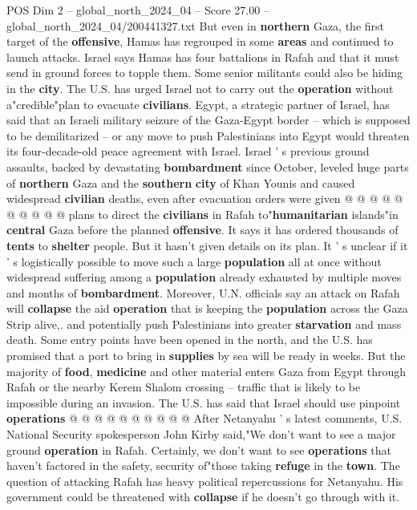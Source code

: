\begin{textsample}{POS Dim 2 – global\_north\_2024\_04 – Score 27.00 – global\_north\_2024\_04/200441327.txt}
But even in \textbf{northern} Gaza, the first target of the \textbf{offensive}, Hamas has regrouped in some \textbf{areas} and continued to launch attacks.
Israel says Hamas has four battalions in Rafah and that it must send in ground forces to topple them.
Some senior militants could also be hiding in the \textbf{city}.
The U.S. has urged Israel not to carry out the \textbf{operation} without a"credible"plan to evacuate \textbf{civilians}.
Egypt, a strategic partner of Israel, has said that an Israeli military seizure of the Gaza-Egypt border -- which is supposed to be demilitarized -- or any move to push Palestinians into Egypt would threaten its four-decade-old peace agreement with Israel.
Israel ' s previous ground assaults, backed by devastating \textbf{bombardment} since October, leveled huge parts of \textbf{northern} Gaza and the \textbf{southern} \textbf{city} of Khan Younis and caused widespread \textbf{civilian} deaths, even after evacuation orders were given @ @ @ @ @ @ @ @ @ @ plans to direct the \textbf{civilians} in Rafah to"\textbf{humanitarian} islands"in \textbf{central} Gaza before the planned \textbf{offensive}.
It says it has ordered thousands of \textbf{tents} to \textbf{shelter} people.
But it hasn't given details on its plan.
It ' s unclear if it ' s logistically possible to move such a large \textbf{population} all at once without widespread suffering among a \textbf{population} already exhausted by multiple moves and months of \textbf{bombardment}.
Moreover, U.N. officials say an attack on Rafah will \textbf{collapse} the aid \textbf{operation} that is keeping the \textbf{population} across the Gaza Strip alive,. and potentially push Palestinians into greater \textbf{starvation} and mass death.
Some entry points have been opened in the north, and the U.S. has promised that a port to bring in \textbf{supplies} by sea will be ready in weeks.
But the majority of \textbf{food}, \textbf{medicine} and other material enters Gaza from Egypt through Rafah or the nearby Kerem Shalom crossing -- traffic that is likely to be impossible during an invasion.
The U.S. has said that Israel should use pinpoint \textbf{operations} @ @ @ @ @ @ @ @ @ @ After Netanyahu ' s latest comments, U.S.
National Security spokesperson John Kirby said,"We don't want to see a major ground \textbf{operation} in Rafah.
Certainly, we don't want to see \textbf{operations} that haven't factored in the safety, security of"those taking \textbf{refuge} in the \textbf{town}.
The question of attacking Rafah has heavy political repercussions for Netanyahu.
His government could be threatened with \textbf{collapse} if he doesn't go through with it.

\end{textsample}
